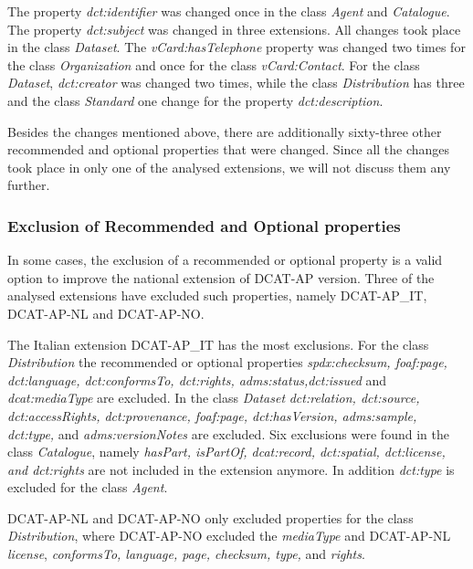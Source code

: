 \documentclass[<options>]{elsarticle}
\begin{document}
The property \textit{dct:identifier}  was changed once in the class \textit{Agent} and \textit{Catalogue}. The property \textit{dct:subject }was changed in three extensions. All changes took place in the class \textit{Dataset}. The \textit{vCard:hasTelephone }property was changed two times for the class \textit{Organization} and once for the class \textit{vCard:Contact}. For the class \textit{Dataset}, \textit{dct:creator} was changed two times, while the class \textit{Distribution}  has three and the class \textit{Standard} one change for the property \textit{dct:description}.

Besides the changes mentioned above, there are additionally sixty-three other recommended and optional properties that were changed. Since all the changes took place in only one of the analysed extensions, we will not discuss them any further.

\subsubsection{Exclusion of Recommended and Optional properties}

In some cases, the exclusion of a recommended or optional property is a valid option to improve the national extension of DCAT-AP version. Three of the analysed extensions have excluded such properties, namely DCAT-AP\_IT, DCAT-AP-NL and DCAT-AP-NO.

The Italian extension DCAT-AP\_IT has the most exclusions. For the class \textit{Distribution} the recommended or optional properties \textit{spdx:checksum, foaf:page, dct:language, dct:conformsTo, dct:rights, adms:status,dct:issued} and \textit{dcat:mediaType }are excluded. In the class \textit{Dataset} \textit{dct:relation, dct:source, dct:accessRights, dct:provenance, foaf:page, dct:hasVersion, adms:sample, dct:type,} and \textit{adms:versionNotes} are excluded. Six exclusions were found in the class \textit{Catalogue}, namely \textit{hasPart, isPartOf, dcat:record, dct:spatial, dct:license, and dct:rights} are not included in the extension anymore. In addition \textit{dct:type} is excluded for the class \textit{Agent}.

DCAT-AP-NL and DCAT-AP-NO only excluded properties for the class \textit{Distribution}, where DCAT-AP-NO excluded the \textit{mediaType} and DCAT-AP-NL \textit{license}, \textit{conformsTo, language, page, checksum, type, }and \textit{rights}.
\end{document}
